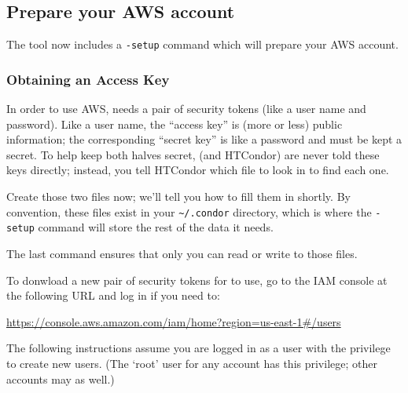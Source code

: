 
\subsection{Prepare your AWS account}

The  tool now includes a \texttt{-setup} command which will
prepare your AWS account.

\subsubsection{Obtaining an Access Key}

In order to use AWS,  needs a pair of security tokens (like a
user name and password).  Like a user name, the ``access key'' is (more or
less) public information; the corresponding ``secret key'' is like a password
and must be kept a secret.  To help keep both halves secret,
 (and HTCondor) are never told these keys directly; instead, you
tell HTCondor which file to look in to find each one.

Create those two files now; we'll tell you how to fill them in shortly.  By
convention, these files exist in your \texttt{\textasciitilde{}/.condor}
directory, which is where the \texttt{-setup} command will store the rest of
the data it needs.


The last command ensures that only you can read or write to those files.

To donwload a new pair of security tokens for  to use, go to
the IAM console at the following URL and log in if you need to:

\url{https://console.aws.amazon.com/iam/home?region=us-east-1#/users}

The following instructions assume you are logged in as a user
with the privilege to create new users.  (The `root' user for any account has
this privilege; other accounts may as well.)

